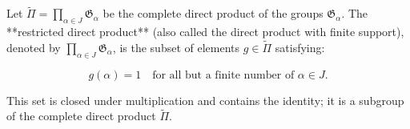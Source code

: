 Let $\tilde{\Pi} = \prod_{\alpha \in J} \mathfrak{G}_{\alpha}$ be the complete direct product of the groups $\mathfrak{G}_{\alpha}$. The **restricted direct product** (also called the direct product with finite support), denoted by $\prod_{\alpha \in J} \mathfrak{G}_{\alpha}$, is the subset of elements $g \in \tilde{\Pi}$ satisfying:

$$g(\alpha) = 1 \quad \text{for all but a finite number of } \alpha \in J.$$

This set is closed under multiplication and contains the identity; it is a subgroup of the complete direct product $\tilde{\Pi}$.
